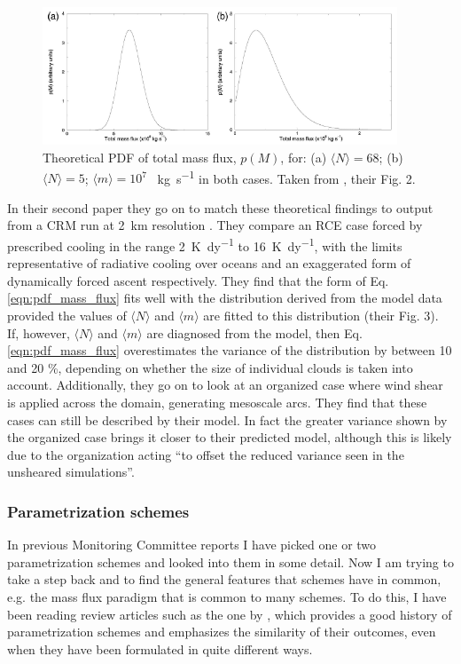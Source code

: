 \documentclass[11pt,a4paper]{article}
\begin{document}
\begin{figure}[hbp!]
    \centering
    \includegraphics[width=400px]{figures/CraigAndCohenFig2}
    \caption{Theoretical PDF of total mass flux, $p(M)$, for: (a) $\langle N \rangle = 68$; (b) $\langle N \rangle = 5$; $\langle m \rangle = 10^7$ \SI{}{kg.s^{-1}} in both cases. Taken from \cite{cohen2006fluctuations}, their Fig. 2.}
    \label{fig:pdf_mass_flux}
\end{figure}

In their second paper they go on to match these theoretical findings to output from a CRM run at \SI{2}{km} resolution \parencite{cohen2006fluctuations}. They compare an RCE case forced by prescribed cooling in the range \SI{2}{K.dy^{-1}} to \SI{16}{K.dy^{-1}}, with the limits representative of radiative cooling over oceans and an exaggerated form of dynamically forced ascent respectively. They find that the form of Eq. \ref{eqn:pdf_mass_flux} fits well with the distribution derived from the model data provided the values of $\langle N \rangle$ and $\langle m \rangle$ are fitted to this distribution (their Fig. 3). If, however, $\langle N \rangle$ and $\langle m \rangle$  are diagnosed from the model, then Eq. \ref{eqn:pdf_mass_flux} overestimates the variance of the distribution by between 10 and 20 \%, depending on whether the size of individual clouds is taken into account. Additionally, they go on to look at an organized case where wind shear is applied across the domain, generating mesoscale arcs. They find that these cases can still be described by their model. In fact the greater variance shown by the organized case brings it closer to their predicted model, although this is likely due to the organization acting ``to offset the reduced variance seen in the unsheared simulations''.


\subsubsection{Parametrization schemes}
In previous Monitoring Committee reports I have picked one or two parametrization schemes and looked into them in some detail. Now I am trying to take a step back and to find the general features that schemes have in common, e.g. the mass flux paradigm that is common to many schemes. To do this, I have been reading review articles such as the one by \cite{arakawa2004cumulus}, which provides a good history of parametrization schemes and emphasizes the similarity of their outcomes, even when they have been formulated in quite different ways. 
\end{document}
